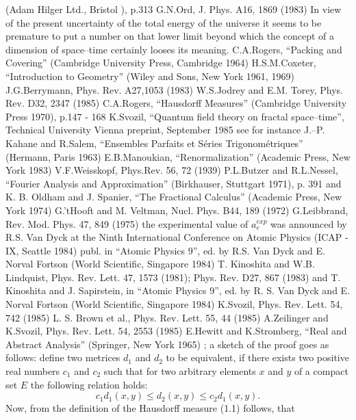 (Adam Hilger Ltd., Bristol    ), p.313
\litem{[20]}G.N.Ord, J. Phys. A16, 1869 (1983)
\litem{[21]}In view of the present uncertainty
of the total energy of the universe it
seems to be premature to put a number on that lower
limit beyond which the concept of a dimension
of space--time certainly looses its meaning.
\litem{[22]}C.A.Rogers, ``Packing and Covering'' (Cambridge University
Press, Cambridge 1964)
\litem{[23]}H.S.M.Coxeter, ``Introduction to Geometry'' (Wiley and Sons,
New York 1961, 1969)
\litem{[24]}J.G.Berrymann, Phys. Rev. A27,1053 (1983)
\litem{[25]}W.S.Jodrey and E.M. Torey, Phys. Rev. D32, 2347 (1985)
\litem{[26]}C.A.Rogers,
``Hausdorff Measures''
(Cambridge University Press 1970), p.147 - 168
\litem{[27]}K.Svozil, ``Quantum field theory on fractal space--time'',
Technical University Vienna preprint, September 1985
\litem{[28]}see for instance J.--P. Kahane and
R.Salem,
``Ensembles Parfaits et S\'eries Trigonom\'e\-triques''
(Hermann, Paris 1963)
\litem{[29]}E.B.Manoukian,
``Renormalization''
(Academic Press, New York 1983)
\litem{[30]}V.F.Weisskopf, Phys.Rev. 56, 72 (1939)
\litem{[31]}P.L.Butzer and R.L.Nessel,
``Fourier Analysis and Approximation''
(Birkhauser, Stuttgart 1971), p. 391
and K. B. Oldham and J. Spanier,
``The Fractional Calculus'' (Academic Press, New York 1974)
\litem{[32]}G.'tHooft and M. Veltman, Nucl. Phys. B44, 189 (1972)
\litem{[33]}G.Leibbrand, Rev. Mod. Phys. 47, 849 (1975)
\litem{[34]}the experimental value of $a_e^{exp}$
was announced by R.S. Van Dyck at the Ninth
International Conference on Atomic Physics
(ICAP - IX, Seattle 1984)
publ. in ``Atomic Physics 9'', ed. by R.S. Van Dyck and
E. Norval Fortson (World Scientific, Singapore 1984)
\litem{[35]}T. Kinoshita and W.B. Lindquist,
Phys. Rev. Lett. 47, 1573 (1981); Phys.
Rev. D27, 867 (1983)
and T. Kinoshita and J. Sapirstein, in ``Atomic Physics 9'',
ed. by R. S. Van Dyck and E. Norval Fortson (World
Scientific, Singapore 1984)
\litem{[36]}K.Svozil, Phys. Rev. Lett. 54, 742 (1985)
\litem{[37]}L. S. Brown et al., Phys. Rev. Lett. 55, 44 (1985)
\litem{[38]}A.Zeilinger and K.Svozil,
Phys. Rev. Lett. 54, 2553 (1985)
\litem{[39]}E.Hewitt and K.Stromberg,
``Real and Abstract Analysis'' (Springer, New York 1965)
; a sketch of the proof goes as follows: define two metrices
$d_1$ and $d_2$ to be equivalent, if there exists two positive
real numbers $c_1$ and $c_2$ such that for two arbitrary
elements $x$ and $y$ of a compact set $E$ the following
relation holds:
$$c_1d_1(x,y)\leq d_2(x,y)\leq c_2d_1(x,y).$$
Now, from the definition of the Hausdorff measure (1.1) follows, that
